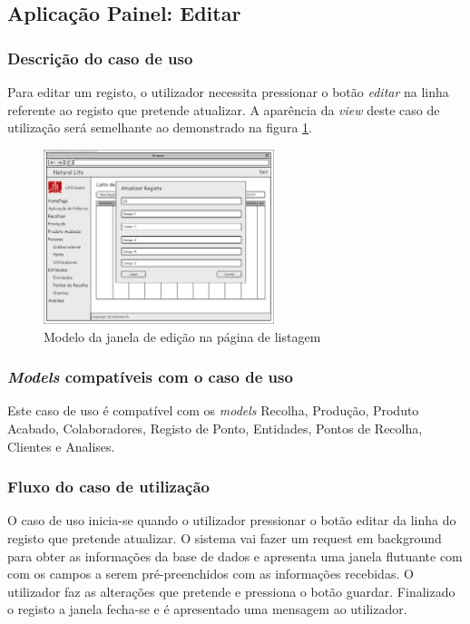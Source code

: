 \subsection{Aplicação Painel: Editar}
\subsubsection*{Descrição do caso de uso}
Para editar um registo, o utilizador necessita pressionar o botão \textit{editar} na linha referente ao registo que pretende atualizar. A aparência da \textit{view} deste caso de utilização será semelhante ao demonstrado na figura \ref{fig:di_editar}. 

\begin{figure}[H] 
	\begin{center}
		\includegraphics[width=0.60\textwidth,keepaspectratio]{figuras/Diagramas_vp/DI_Painel_3_Editar.jpg}
		\caption{Modelo da janela de edição na página de listagem}
		\label{fig:di_editar} 
	\end{center}
\end{figure}

\subsubsection*{\textit{Models} compatíveis com o caso de uso}
Este caso de uso é compatível com os \textit{models} Recolha, Produção, Produto Acabado, Colaboradores, Registo de Ponto, Entidades, Pontos de Recolha, Clientes e Analises.

\subsubsection*{Fluxo do caso de utilização}
O caso de uso inicia-se quando o utilizador pressionar o botão editar da linha do registo que pretende atualizar. O sistema vai fazer um request em background para obter as informações da base de dados e apresenta uma janela flutuante com com os campos a serem pré-preenchidos com as informações recebidas. O utilizador faz as alterações que pretende e pressiona o botão guardar. Finalizado o registo a janela fecha-se e é apresentado uma mensagem ao utilizador.



